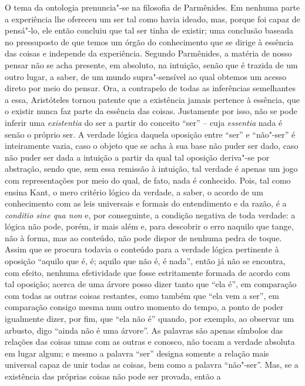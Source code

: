 O tema da ontologia prenuncia"-se na filosofia de Parmênides. Em nenhuma \label{temadaontologia}
parte a experiência lhe ofereceu um ser tal como havia ideado, mas,
porque foi capaz de pensá"-lo, ele então concluiu que tal ser tinha de
existir; uma conclusão baseada no pressuposto de que temos um órgão do
conhecimento que se dirige à essência das coisas e independe da
experiência. Segundo Parmênides, a matéria de nosso pensar não se acha
presente, em absoluto, na intuição, senão que é trazida de um outro
lugar, a saber, de um mundo supra"-sensível ao qual obtemos um acesso
direto por meio do pensar. Ora, a contrapelo de todas as inferências
semelhantes a essa, Aristóteles tornou patente que a existência jamais
pertence à essência, que o existir nunca faz parte da essência das
coisas. Justamente por isso, não se pode inferir uma
\textit{existentia} do ser a partir do conceito ``ser'' -- cuja
\textit{essentia} nada é senão o próprio ser. A verdade lógica daquela
oposição entre ``ser'' e ``não"-ser'' é inteiramente vazia, caso o objeto
que se acha à sua base não puder ser dado, caso não puder ser dada a
intuição a partir da qual tal oposição deriva"-se por abstração,
sendo que, sem essa remissão à intuição, tal verdade é apenas um jogo
com representações por meio do qual, de fato, nada é conhecido. Pois,
tal como ensina Kant, o mero critério lógico da verdade, a saber, 
o acordo de um conhecimento com as leis universais e formais do
entendimento e da razão, é a \textit{conditio sine qua non} e,
por conseguinte, a condição negativa de toda verdade: a lógica não
pode, porém, ir mais além e, para descobrir o erro naquilo que tange,
não à forma, mas ao conteúdo, não pode dispor de nenhuma pedra de
toque. Assim que se procura todavia o conteúdo para a verdade lógica
pertinente à oposição ``aquilo que é, é; aquilo que não é, é nada'', então
já não se encontra, com efeito, nenhuma efetividade que fosse
estritamente formada de acordo com tal oposição; acerca de uma árvore
posso dizer tanto que ``ela é'', em comparação com todas as outras coisas
restantes, como também que ``ela vem a ser'', em comparação consigo mesma
num outro momento do tempo, a ponto de poder igualmente dizer, por fim,
que ``ela não é'' quando, por exemplo, ao observar um arbusto, digo
``ainda não é uma árvore''. As palavras são apenas símbolos das relações
das coisas umas com as outras e conosco, não tocam a verdade absoluta
em lugar algum; e mesmo a palavra ``ser'' designa somente a relação mais
universal capaz de unir todas as coisas, bem como a palavra ``não"-ser''.
Mas, se a existência das próprias coisas não pode ser provada, então a
